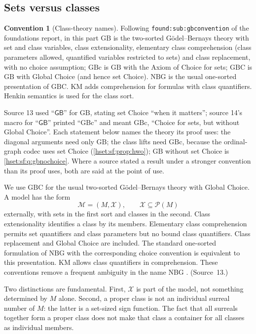 \documentclass[11pt,letterpaper]{article}
\theoremstyle{definition}
\newtheorem{convention}[convention]{Convention}\aliascntresetthe{convention}
\theoremstyle{remark}
\newcommand{\Pow}{\mathcal P}
\newcommand{\lbl}[1]{\nolinkurl{#1}}
\newcommand{\GB}{\mathrm{GB}}
\newcommand{\GBc}{\mathrm{GBc}}
\newcommand{\GBC}{\mathrm{GBC}}
\newcommand{\NBG}{\mathrm{NBG}}
\newcommand{\KM}{\mathrm{KM}}
\begin{document}
\subsection{Sets versus classes}
\label{hset:sf:sub:classes}

\begin{convention}[Class-theory names]\label{hset:sf:conv:gb}
Following \lbl{found:sub:gbconvention} of the foundations report, in this part
$\GB$ is the two-sorted G\"odel--Bernays theory with set and class variables,
class extensionality, elementary class comprehension (class parameters allowed,
quantified variables restricted to sets) and class replacement, with no choice
assumption; $\GBc$ is $\GB$ with the Axiom of Choice for sets; $\GBC$ is $\GB$
with Global Choice (and hence set Choice). $\NBG$ is the usual one-sorted
presentation of $\GBC$. $\KM$ adds comprehension for formulas with class
quantifiers. Henkin semantics is used for the class sort.

Source 13 used ``$\mathsf{GB}$'' for $\GB$, stating set Choice ``when it
matters''; source 14's macro for ``$\mathsf{GB}$'' printed ``GBc'' and meant
$\GBc$, ``Choice for sets, but without Global Choice''. Each statement below
names the theory its proof uses: the diagonal arguments need only $\GB$; the
class lifts need $\GBc$, because the ordinal-graph codec uses set Choice
(\cref{hset:sf:prop:hwo}); $\GB$ without set Choice is
\cref{hset:sf:q:gbnochoice}. Where a source stated a result under a stronger
convention than its proof uses, both are said at the point of use.
\end{convention}

We use $\GBC$ for the usual two-sorted G\"odel--Bernays theory with Global Choice.
A model has the form
\[
 \mathcal M=(M,\mathcal X),
 \qquad \mathcal X\subseteq\Pow(M)
\]
externally, with sets in the first sort and classes in the second. Class
extensionality identifies a class by its members. Elementary class comprehension
permits set quantifiers and class parameters but no bound class quantifiers.
Class replacement and Global Choice are included. The standard one-sorted
formulation of $\NBG$ with the corresponding choice convention is equivalent to
this presentation. $\KM$ allows class quantifiers in comprehension. These
conventions remove a frequent ambiguity in the name NBG
\cite{HamkinsYao,WilliamsMin}. (Source~13.)

Two distinctions are fundamental. First, $\mathcal X$ is part of the model, not
something determined by $M$ alone. Second, a proper class is not an individual
surreal number of $M$: the latter is a set-sized sign function. The fact that all
surreals together form a proper class does not make that class a container for
all classes as individual members.
\end{document}
